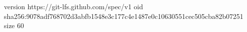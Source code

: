 version https://git-lfs.github.com/spec/v1
oid sha256:9078adf768702d3abfb1548e3c177c4e1487e0c10630551cec505cba82b07251
size 60
